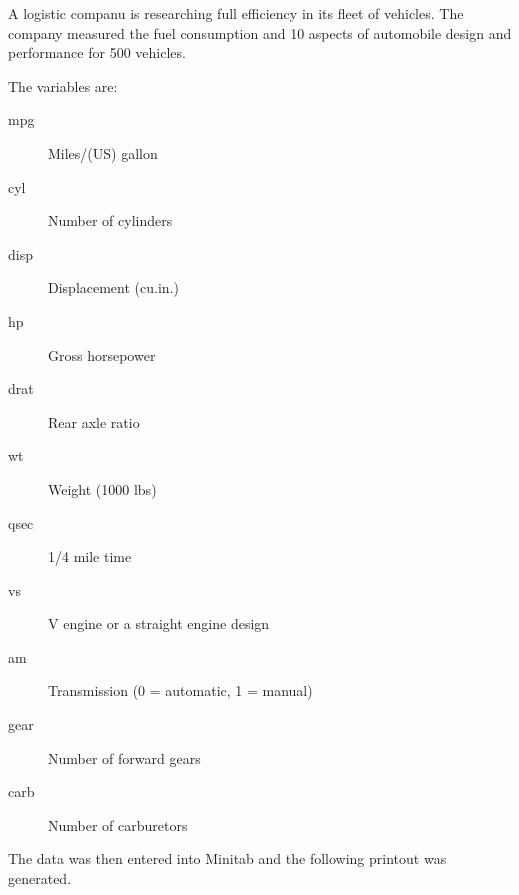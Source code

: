 \documentclass[a4paper,12pt]{article}
\begin{document}
A logistic companu is researching full efficiency in its fleet of vehicles. The company measured the fuel consumption and 10 aspects of automobile design and performance for 500 vehicles.

\begin{framed}
\noindent The variables are:

\begin{description}
			
			\item[	mpg	]	Miles/(US) gallon
			\item[	cyl	]	Number of cylinders
			\item[	disp	]	Displacement (cu.in.)
			\item[	hp	]	Gross horsepower
			\item[	drat	]	Rear axle ratio
			\item[	wt	]	Weight (1000 lbs)
			\item[	qsec	]	1/4 mile time
			\item[	vs	]	V engine or a straight engine design
			\item[	am	]	Transmission (0 = automatic, 1 = manual)
			\item[	gear	]	Number of forward gears
			\item[	carb	]	Number of carburetors
\end{description}
\end{framed}
\noindent The data was then entered into
Minitab and the following printout was generated.\\
\medskip
\end{document}
